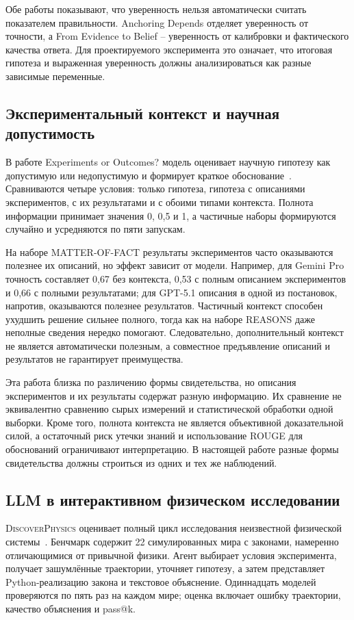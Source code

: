 \documentclass[a4paper,14pt]{extarticle}
\begin{document}
Обе работы показывают, что уверенность нельзя автоматически считать показателем правильности. Anchoring Depends отделяет уверенность от точности, а From Evidence to Belief -- уверенность от калибровки и фактического качества ответа. Для проектируемого эксперимента это означает, что итоговая гипотеза и выраженная уверенность должны анализироваться как разные зависимые переменные.

\subsection{Экспериментальный контекст и научная допустимость}

В работе Experiments or Outcomes? модель оценивает научную гипотезу как допустимую или недопустимую и формирует краткое обоснование~\cite{experimentsoutcomes}. Сравниваются четыре условия: только гипотеза, гипотеза с описаниями экспериментов, с их результатами и с обоими типами контекста. Полнота информации принимает значения 0, 0{,}5 и 1, а частичные наборы формируются случайно и усредняются по пяти запускам.

На наборе MATTER-OF-FACT результаты экспериментов часто оказываются полезнее их описаний, но эффект зависит от модели. Например, для Gemini Pro точность составляет 0{,}67 без контекста, 0{,}53 с полным описанием экспериментов и 0{,}66 с полными результатами; для GPT-5.1 описания в одной из постановок, напротив, оказываются полезнее результатов. Частичный контекст способен ухудшить решение сильнее полного, тогда как на наборе REASONS даже неполные сведения нередко помогают. Следовательно, дополнительный контекст не является автоматически полезным, а совместное предъявление описаний и результатов не гарантирует преимущества.

Эта работа близка по различению формы свидетельства, но описания экспериментов и их результаты содержат разную информацию. Их сравнение не эквивалентно сравнению сырых измерений и статистической обработки одной выборки. Кроме того, полнота контекста не является объективной доказательной силой, а остаточный риск утечки знаний и использование ROUGE для обоснований ограничивают интерпретацию. В настоящей работе разные формы свидетельства должны строиться из одних и тех же наблюдений.

\subsection{LLM в интерактивном физическом исследовании}

\textsc{DiscoverPhysics} оценивает полный цикл исследования неизвестной физической системы~\cite{discoverphysics}. Бенчмарк содержит 22 симулированных мира с законами, намеренно отличающимися от привычной физики. Агент выбирает условия эксперимента, получает зашумлённые траектории, уточняет гипотезу, а затем представляет Python-реализацию закона и текстовое объяснение. Одиннадцать моделей проверяются по пять раз на каждом мире; оценка включает ошибку траектории, качество объяснения и pass@k.
\end{document}

